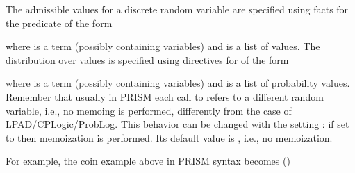 \documentclass[letterpaper,10pt,english]{sphinxmanual}
\begin{document}
\sphinxAtStartPar
The admissible values for a discrete random variable are specified using facts for the  predicate
of the form

\begin{sphinxVerbatim}[commandchars=\\\{\}]
\end{sphinxVerbatim}

\sphinxAtStartPar
where  is a term (possibly containing variables) and  is a list of values.
The distribution over values is specified using directives for  of the form

\begin{sphinxVerbatim}[commandchars=\\\{\}]
 
\end{sphinxVerbatim}

\sphinxAtStartPar
where  is a term (possibly containing variables) and  is a list of probability values.
Remember that usually in PRISM each call to  refers to a different random variable, i.e., no memoing is performed, differently from the case of LPAD/CP\sphinxhyphen{}Logic/ProbLog.
This behavior can be changed with the setting : if set to  then memoization is performed.
Its default value is , i.e., no memoization.

\sphinxAtStartPar
For example, the coin example above in PRISM syntax becomes ()
\end{document}
